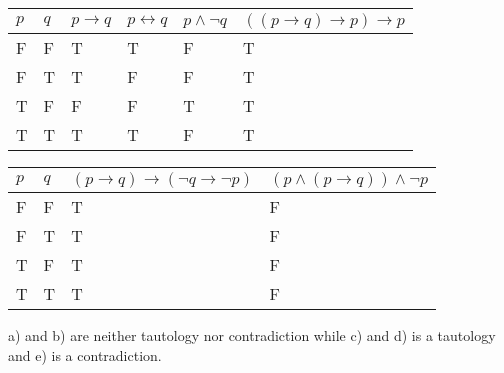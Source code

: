 \documentclass{article}
\begin{document}
\begin{tabular}{ll||l|l|l|l}
  $p$ & $q$ & $p \rightarrow q$ & $p \leftrightarrow q$ & $p \wedge \neg q$ & $ ((p \rightarrow q) \rightarrow p) \rightarrow p$\\
  \hline
  F & F & T & T & F & T\\
  F & T & T & F & F & T\\
  T & F & F & F & T & T\\
  T & T & T & T & F & T
\end{tabular}
\break
\begin{tabular}{ll||l|l}
  $p$ & $q$ & $(p \rightarrow q) \rightarrow (\neg q \rightarrow \neg p)$ & $(p\wedge(p \rightarrow q)) \wedge \neg p$\\
  \hline
  F & F & T & F\\
  F & T & T & F\\
  T & F & T & F\\
  T & T & T & F
\end{tabular} \break \break
a) and b) are neither tautology nor contradiction while c) and d) is a tautology and e) is a contradiction.
\end{document}
